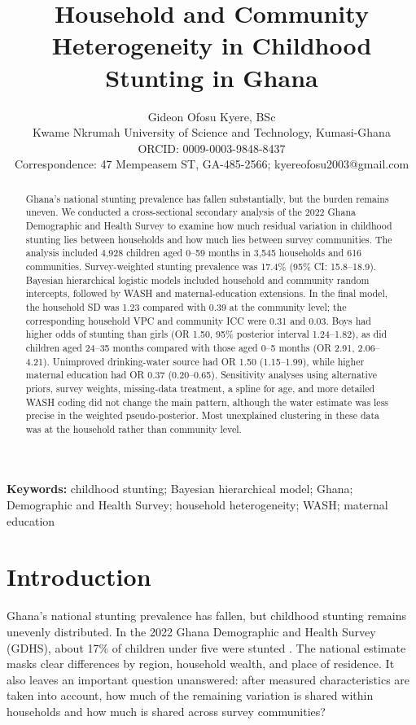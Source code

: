 \documentclass[11pt]{article}
\title{Household and Community Heterogeneity in Childhood Stunting in Ghana}
\author{Gideon Ofosu Kyere, BSc\\\small Kwame Nkrumah University of Science and Technology, Kumasi-Ghana\\\small ORCID: 0009-0003-9848-8437\\\small Correspondence: 47 Mempeasem ST, GA-485-2566; kyereofosu2003@gmail.com}
\date{}
\begin{document}
\maketitle

\begin{abstract}
\noindent
Ghana's national stunting prevalence has fallen substantially, but the burden remains uneven. We conducted a cross-sectional secondary analysis of the 2022 Ghana Demographic and Health Survey to examine how much residual variation in childhood stunting lies between households and how much lies between survey communities. The analysis included 4,928 children aged 0--59 months in 3,545 households and 616 communities. Survey-weighted stunting prevalence was 17.4\% (95\% CI: 15.8--18.9). Bayesian hierarchical logistic models included household and community random intercepts, followed by WASH and maternal-education extensions. In the final model, the household SD was 1.23 compared with 0.39 at the community level; the corresponding household VPC and community ICC were 0.31 and 0.03. Boys had higher odds of stunting than girls (OR 1.50, 95\% posterior interval 1.24--1.82), as did children aged 24--35 months compared with those aged 0--5 months (OR 2.91, 2.06--4.21). Unimproved drinking-water source had OR 1.50 (1.15--1.99), while higher maternal education had OR 0.37 (0.20--0.65). Sensitivity analyses using alternative priors, survey weights, missing-data treatment, a spline for age, and more detailed WASH coding did not change the main pattern, although the water estimate was less precise in the weighted pseudo-posterior. Most unexplained clustering in these data was at the household rather than community level.
\end{abstract}

\noindent\textbf{Keywords:} childhood stunting; Bayesian hierarchical model; Ghana; Demographic and Health Survey; household heterogeneity; WASH; maternal education




\section{Introduction}

Ghana's national stunting prevalence has fallen, but childhood stunting remains unevenly distributed. In the 2022 Ghana Demographic and Health Survey (GDHS), about 17\% of children under five were stunted \citep{GSSICF2024}. The national estimate masks clear differences by region, household wealth, and place of residence. It also leaves an important question unanswered: after measured characteristics are taken into account, how much of the remaining variation is shared within households and how much is shared across survey communities?
\end{document}
